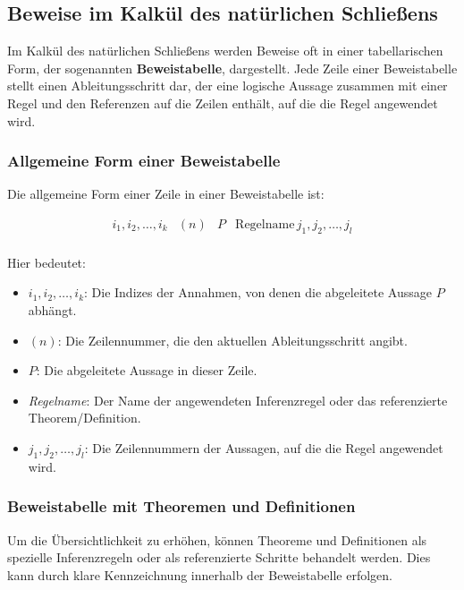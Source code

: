 \documentclass[main.tex]{subfiles}
\begin{document}
\subsection{Beweise im Kalkül des natürlichen Schließens}

Im Kalkül des natürlichen Schließens werden Beweise oft in einer tabellarischen Form, der sogenannten \textbf{Beweistabelle}, dargestellt. Jede Zeile einer Beweistabelle stellt einen Ableitungsschritt dar, der eine logische Aussage zusammen mit einer Regel und den Referenzen auf die Zeilen enthält, auf die die Regel angewendet wird.

\subsubsection{Allgemeine Form einer Beweistabelle}

Die allgemeine Form einer Zeile in einer Beweistabelle ist:

\[
\begin{array}{llll}
	i_1, i_2, \ldots, i_k & (n) & P & \text{Regelname} \, j_1, j_2, \ldots, j_l \\
\end{array}
\]

Hier bedeutet:
\begin{itemize}
    \item \(i_1, i_2, \ldots, i_k\): Die Indizes der Annahmen, von denen die abgeleitete Aussage \(P\) abhängt.
    \item \((n)\): Die Zeilennummer, die den aktuellen Ableitungsschritt angibt.
    \item \(P\): Die abgeleitete Aussage in dieser Zeile.
    \item \textit{Regelname}: Der Name der angewendeten Inferenzregel oder das referenzierte Theorem/Definition.
    \item \(j_1, j_2, \ldots, j_l\): Die Zeilennummern der Aussagen, auf die die Regel angewendet wird.
\end{itemize}

\subsubsection{Beweistabelle mit Theoremen und Definitionen}

Um die Übersichtlichkeit zu erhöhen, können Theoreme und Definitionen als spezielle Inferenzregeln oder als referenzierte Schritte behandelt werden. Dies kann durch klare Kennzeichnung innerhalb der Beweistabelle erfolgen.
\end{document}
